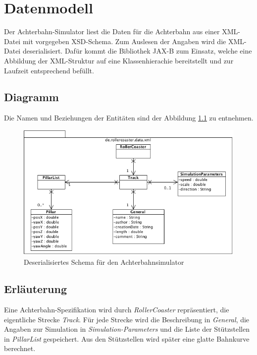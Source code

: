 \chapter{Datenmodell}
Der Achterbahn-Simulator liest die Daten für die Achterbahn aus einer XML-Datei
mit vorgegeben XSD-Schema. Zum Auslesen der Angaben wird die XML-Datei deserialisiert.
Dafür kommt die Bibliothek JAX-B zum Einsatz, welche eine Abbildung der XML-Struktur
auf eine Klassenhierachie bereitstellt und zur Laufzeit entsprechend befüllt.

\section{Diagramm}
Die Namen und Beziehungen der Entitäten sind der Abbildung \ref{fig:xml} zu entnehmen.

\begin{figure}
\includegraphics[width=\linewidth]{bilder/XML.png}
\caption{Deserialisiertes Schema für den Achterbahnsimulator}
\label{fig:xml}
\end{figure}

\section{Erläuterung}
Eine Achterbahn-Spezifikation wird durch \emph{RollerCoaster}
repräsentiert, die eigentliche Strecke \emph{Track}. Für jede Strecke
wird die Beschreibung in \emph{General}, die Angaben zur Simulation
in \emph{Simulation-Parameters} und die Liste der Stützstellen 
in \emph{PillarList} gespeichert. Aus den Stützstellen wird später eine
glatte Bahnkurve berechnet.


